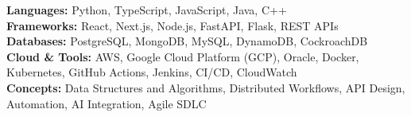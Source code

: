 \documentclass{article}
\begin{document}
{\small
\noindent \textbf{Languages:} Python, TypeScript, JavaScript, Java, C++ \\
\noindent \textbf{Frameworks:} React, Next.js, Node.js, FastAPI, Flask, REST APIs \\
\noindent \textbf{Databases:} PostgreSQL, MongoDB, MySQL, DynamoDB, CockroachDB \\
\noindent \textbf{Cloud \& Tools:} AWS, Google Cloud Platform (GCP), Oracle, Docker, Kubernetes, GitHub Actions, Jenkins, CI/CD, CloudWatch \\
\noindent \textbf{Concepts:} Data Structures and Algorithms, Distributed Workflows, API Design, Automation, AI Integration, Agile SDLC
}
\end{document}
